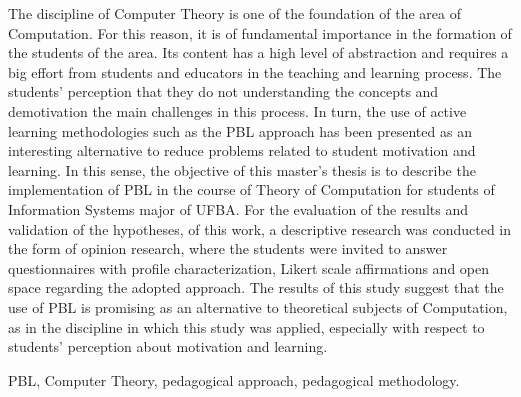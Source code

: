 \abstract
The discipline of Computer Theory is one of the foundation
of the area of Computation. For this reason, it is of fundamental
importance in the formation of the students of the area.
Its content has a high level of abstraction and requires a
big effort from students and educators in the teaching and
learning process.
The students' perception that they do not understanding the
concepts and demotivation the main challenges
in this process.
In turn, the use of active learning methodologies such as
the \ac{PBL} approach has been presented as an interesting
alternative to reduce problems related to student motivation
and learning.
In this sense, the objective of this master's thesis is
to describe the implementation of \ac{PBL} in
the course of Theory of Computation for students of
Information Systems major of \ac{UFBA}.
For the evaluation of the results and validation
of the hypotheses, of this work, a descriptive
research was conducted in the form of opinion research,
where the students were invited to answer questionnaires with
profile characterization, Likert scale affirmations
and open space regarding the adopted approach.
The results of this study suggest that the use
of \ac{PBL} is promising as an alternative to theoretical
subjects of Computation, as in the discipline in which this
study was applied, especially with respect to
students' perception about motivation and learning.
\begin{keywords}
\ac{PBL}, Computer Theory, pedagogical approach,
pedagogical methodology.
\end{keywords}
